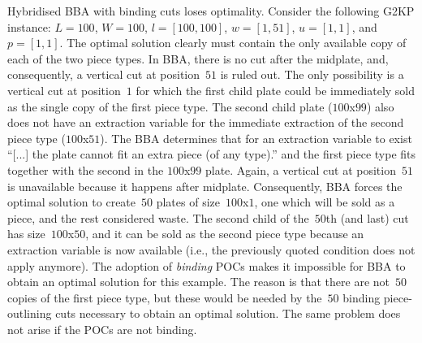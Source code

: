 \documentclass[ppgc,tese,english,formais,babel]{iiufrgs}
\begin{document}
\begin{example}{Hybridised BBA with binding cuts loses optimality.}
Consider the following G2KP instance: \(L = 100\), \(W = 100\), \(l = [100, 100]\), \(w = [1, 51]\), \(u = [1, 1]\), and \(p = [1, 1]\).
The optimal solution clearly must contain the only available copy of each of the two piece types.
In BBA, there is no cut after the midplate, and, consequently, a vertical cut at position~\(51\) is ruled out.
The only possibility is a vertical cut at position~\(1\) for which the first child plate could be immediately sold as the single copy of the first piece type.
The second child plate (\(100\)x\(99\)) also does not have an extraction variable for the immediate extraction of the second piece type (\(100\)x\(51\)).
The BBA determines that for an extraction variable to exist ``[...] the plate cannot fit an extra piece (of any type).'' and the first piece type fits together with the second in the \(100\)x\(99\) plate.
Again, a vertical cut at position~\(51\) is unavailable because it happens after midplate.
Consequently, BBA forces the optimal solution to create~\(50\) plates of size~\(100\)x\(1\), one which will be sold as a piece, and the rest considered waste.
The second child of the~\(50\)th (and last) cut has size~\(100\)x\(50\), and it can be sold as the second piece type because an extraction variable is now available (i.e., the previously quoted condition does not apply anymore).
The adoption of \emph{binding} POCs makes it impossible for BBA to obtain an optimal solution for this example.
The reason is that there are not~\(50\) copies of the first piece type, but these would be needed by the~\(50\) binding piece-outlining cuts necessary to obtain an optimal solution.
The same problem does not arise if the POCs are not binding.
\end{example}
\end{document}
